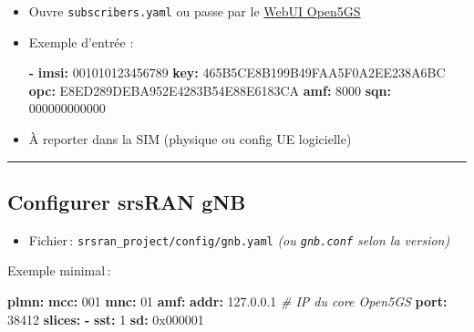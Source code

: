 \documentclass[
]{article}
\newenvironment{Shaded}{\begin{snugshade}}{\end{snugshade}}
\newcommand{\AttributeTok}[1]{\textcolor[rgb]{0.13,0.29,0.53}{#1}}
\newcommand{\CommentTok}[1]{\textcolor[rgb]{0.56,0.35,0.01}{\textit{#1}}}
\newcommand{\DecValTok}[1]{\textcolor[rgb]{0.00,0.00,0.81}{#1}}
\newcommand{\FloatTok}[1]{\textcolor[rgb]{0.00,0.00,0.81}{#1}}
\newcommand{\FunctionTok}[1]{\textcolor[rgb]{0.13,0.29,0.53}{\textbf{#1}}}
\newcommand{\KeywordTok}[1]{\textcolor[rgb]{0.13,0.29,0.53}{\textbf{#1}}}
\newcommand{\StringTok}[1]{\textcolor[rgb]{0.31,0.60,0.02}{#1}}
\providecommand{\tightlist}{%
  \setlength{\itemsep}{0pt}\setlength{\parskip}{0pt}}
\begin{document}
\begin{itemize}
\item
  Ouvre \texttt{subscribers.yaml} ou passe par le
  \href{https://github.com/open5gs/open5gs/wiki/WebUI}{WebUI Open5GS}
\item
  Exemple d'entrée :

\begin{Shaded}
\begin{Highlighting}[]
\KeywordTok{{-}}\AttributeTok{ }\FunctionTok{imsi}\KeywordTok{:}\AttributeTok{ }\StringTok{\textquotesingle{}001010123456789\textquotesingle{}}
\AttributeTok{  }\FunctionTok{key}\KeywordTok{:}\AttributeTok{ }\StringTok{\textquotesingle{}465B5CE8B199B49FAA5F0A2EE238A6BC\textquotesingle{}}
\AttributeTok{  }\FunctionTok{opc}\KeywordTok{:}\AttributeTok{ }\StringTok{\textquotesingle{}E8ED289DEBA952E4283B54E88E6183CA\textquotesingle{}}
\AttributeTok{  }\FunctionTok{amf}\KeywordTok{:}\AttributeTok{ }\StringTok{\textquotesingle{}8000\textquotesingle{}}
\AttributeTok{  }\FunctionTok{sqn}\KeywordTok{:}\AttributeTok{ }\StringTok{\textquotesingle{}000000000000\textquotesingle{}}
\end{Highlighting}
\end{Shaded}
\item
  À reporter dans la SIM (physique ou config UE logicielle)
\end{itemize}

\begin{center}\rule{0.5\linewidth}{0.5pt}\end{center}

\subsection{Configurer srsRAN gNB}\label{configurer-srsran-gnb}

\begin{itemize}
\tightlist
\item
  Fichier\,: \texttt{srsran\_project/config/gnb.yaml} \emph{(ou
  \texttt{gnb.conf} selon la version)}
\end{itemize}

Exemple minimal\,:

\begin{Shaded}
\begin{Highlighting}[]
\FunctionTok{plmn}\KeywordTok{:}
\AttributeTok{  }\FunctionTok{mcc}\KeywordTok{:}\AttributeTok{ }\DecValTok{001}
\AttributeTok{  }\FunctionTok{mnc}\KeywordTok{:}\AttributeTok{ }\DecValTok{01}
\FunctionTok{amf}\KeywordTok{:}
\AttributeTok{  }\FunctionTok{addr}\KeywordTok{:}\AttributeTok{ }\FloatTok{127.0.0.1}\CommentTok{   \# IP du core Open5GS}
\AttributeTok{  }\FunctionTok{port}\KeywordTok{:}\AttributeTok{ }\DecValTok{38412}
\FunctionTok{slices}\KeywordTok{:}
\AttributeTok{  }\KeywordTok{{-}}\AttributeTok{ }\FunctionTok{sst}\KeywordTok{:}\AttributeTok{ }\DecValTok{1}
\AttributeTok{    }\FunctionTok{sd}\KeywordTok{:}\AttributeTok{ }\DecValTok{0x000001}
\end{Highlighting}
\end{Shaded}
\end{document}
